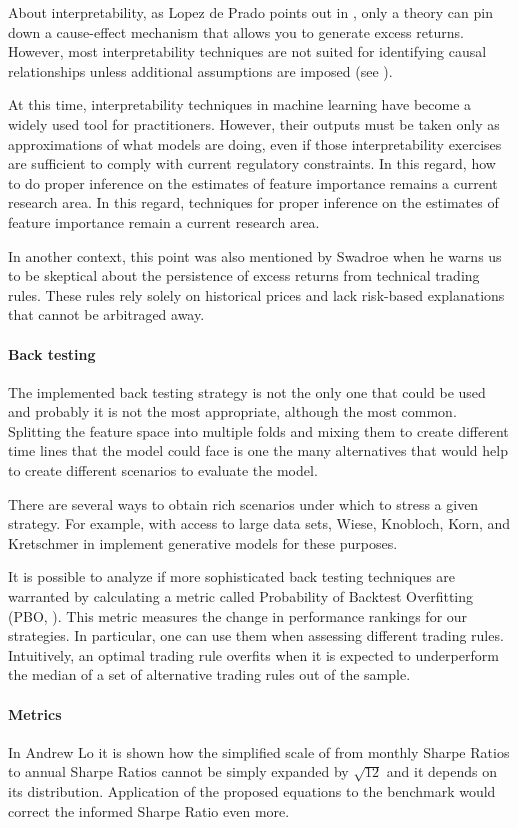 About interpretability, as Lopez de Prado points out in \cite{machine_learning_for_asset_managers}, only a theory can pin down
a cause-effect mechanism that allows you to generate excess returns. However,
most interpretability techniques are not suited for identifying causal
relationships unless additional assumptions are imposed (see \cite{causal_interpretations_of_bb_models}).  

At this time, interpretability techniques in machine learning have become a widely used tool for practitioners. However, their outputs must be taken only as approximations of what models are doing, even if those interpretability exercises are sufficient to comply with current regulatory constraints. In this regard, how to do proper inference on the estimates of feature importance remains a current research area.  In this regard, techniques for proper inference on the estimates of feature importance remain a current research area.

In another context, this point was also mentioned by Swadroe \cite{your_complete_guide_to_factor_investing} when he warns us to be skeptical about the persistence of excess returns from technical trading rules. These rules rely solely on historical prices and lack risk-based explanations that cannot be arbitraged away.


\paragraph{Back testing} The implemented back testing strategy is not the only
one that could be used and probably it is not the most appropriate, although the
most common. Splitting the feature space into multiple folds and mixing them
to create different time lines that the model could face is one the many alternatives
that would help to create different scenarios to evaluate the model.

There are several ways to obtain rich scenarios under which to stress a given strategy. For example,  with access to large data sets, Wiese, Knobloch, Korn, and Kretschmer in \cite{quant_gans} implement generative models for these purposes.

It is possible to analyze if more sophisticated back testing techniques are warranted by calculating a metric called  Probability of Backtest Overfitting (PBO, \cite{lopez_de_prado}).  This metric measures the change in performance rankings for our strategies.  In particular, one can use them when assessing different trading rules.   Intuitively, an optimal trading rule overfits when it is expected to underperform the median of a set of alternative trading rules out of the sample.

\paragraph{Metrics} In Andrew Lo \cite{the_statistics_of_sharpe_ratio} it is
shown how the simplified scale of from monthly Sharpe Ratios to annual Sharpe
Ratios cannot be simply expanded by $\sqrt{12}$ and it depends on its
distribution. Application of the proposed equations to the benchmark would correct
the informed Sharpe Ratio even more. 

